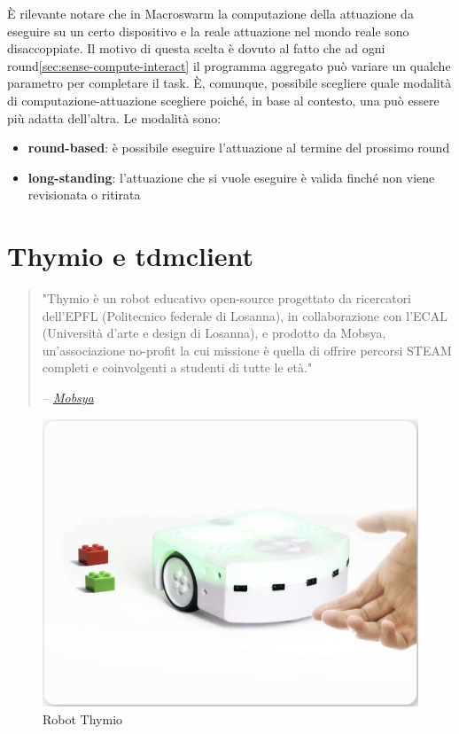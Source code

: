 \documentclass[12pt,a4paper,openright,twoside]{book}
\begin{document}
È rilevante notare che in Macroswarm la computazione della attuazione da eseguire su un certo dispositivo e la reale attuazione nel mondo reale sono disaccoppiate. Il motivo di questa scelta è dovuto al fatto che ad ogni round\cref{sec:sense-compute-interact} il programma aggregato può variare un qualche parametro per completare il task. È, comunque, possibile scegliere quale modalità di computazione-attuazione scegliere poiché, in base al contesto, una può essere più adatta dell'altra. Le modalità sono:
\begin{itemize}
    \item \textbf{round-based}: è possibile eseguire l'attuazione al termine del prossimo round
    \item \textbf{long-standing}: l'attuazione che si vuole eseguire è valida finché non viene revisionata o ritirata
\end{itemize}





\section{Thymio e tdmclient}

\begin{quote}
    "Thymio è un robot educativo open-source progettato da ricercatori dell'EPFL (Politecnico federale di Losanna), in collaborazione con l'ECAL (Università d'arte e design di Losanna), e prodotto da Mobsya, un'associazione no-profit la cui missione è quella di offrire percorsi STEAM completi e coinvolgenti a studenti di tutte le età."
    \begin{flushright}
        \textit{-- \href{https://www.thymio.org/}{Mobsya}}
    \end{flushright}
\end{quote}

\begin{figure}
    \centering
    \includegraphics[width=.7\linewidth]{figures/thymio.png}
    \caption{Robot Thymio}
    \label{fig:interpreter-vs-compiler-robot}
\end{figure}
\end{document}
